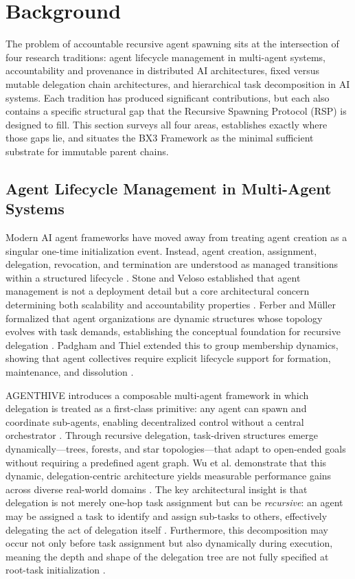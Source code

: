 \documentclass[11pt,oneside]{article}
\begin{document}
\section{Background}\label{sec:rs-background}

The problem of accountable recursive agent spawning sits at the intersection of four research traditions: agent lifecycle management in multi-agent systems, accountability and provenance in distributed AI architectures, fixed versus mutable delegation chain architectures, and hierarchical task decomposition in AI systems. Each tradition has produced significant contributions, but each also contains a specific structural gap that the Recursive Spawning Protocol (RSP) is designed to fill. This section surveys all four areas, establishes exactly where those gaps lie, and situates the BX3 Framework as the minimal sufficient substrate for immutable parent chains.

\subsection{Agent Lifecycle Management in Multi-Agent Systems}\label{sec:lifecycle}

Modern AI agent frameworks have moved away from treating agent creation as a singular one-time initialization event. Instead, agent creation, assignment, delegation, revocation, and termination are understood as managed transitions within a structured lifecycle \cite{wooldridge1995,stone2000,ferber1996}. Stone and Veloso established that agent management is not a deployment detail but a core architectural concern determining both scalability and accountability properties \cite{stone2000}. Ferber and M\"uller formalized that agent organizations are dynamic structures whose topology evolves with task demands, establishing the conceptual foundation for recursive delegation \cite{ferber1996}. Padgham and Thiel extended this to group membership dynamics, showing that agent collectives require explicit lifecycle support for formation, maintenance, and dissolution \cite{padgham2001}.

AGENTHIVE introduces a composable multi-agent framework in which delegation is treated as a first-class primitive: any agent can spawn and coordinate sub-agents, enabling decentralized control without a central orchestrator \cite{agenthive2025}. Through recursive delegation, task-driven structures emerge dynamically---trees, forests, and star topologies---that adapt to open-ended goals without requiring a predefined agent graph. Wu et al. demonstrate that this dynamic, delegation-centric architecture yields measurable performance gains across diverse real-world domains \cite{agenthive2025}. The key architectural insight is that delegation is not merely one-hop task assignment but can be \emph{recursive}: an agent may be assigned a task to identify and assign sub-tasks to others, effectively delegating the act of delegation itself \cite{arxiv2602.11865}. Furthermore, this decomposition may occur not only before task assignment but also dynamically during execution, meaning the depth and shape of the delegation tree are not fully specified at root-task initialization \cite{arxiv2602.11865}.
\end{document}
